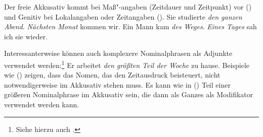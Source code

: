 Der freie Akkusativ kommt bei Maß"-angaben (Zeitdauer und Zeitpunkt)
vor () und Genitiv bei Lokalangaben oder Zeitangaben ().
\eal
\ex Sie studierte \emph{den ganzen Abend}.
\ex \emph{Nächsten Monat} kommen wir.
\zl
\eal
\ex Ein Mann kam \emph{des Weges}.
\ex \emph{Eines Tages} sah ich sie wieder.
\zl

Interessanterweise können auch komplexere Nominalphrasen als Adjunkte verwendet werden:\footnote{
  Siehe hierzu auch .
}
\ea
\label{bsp-den-groessten-Teil-der-Woche}
Er arbeitet \emph{den größten Teil der Woche} zu hause.
\z
Beispiele wie () zeigen, dass das Nomen, das den Zeitausdruck beisteuert, nicht
notwendigerweise im Akkusativ stehen muss. Es kann wie in () Teil einer größeren
Nominalphrase im Akkusativ sein, die dann als Ganzes als Modifikator verwendet werden kann.
%





